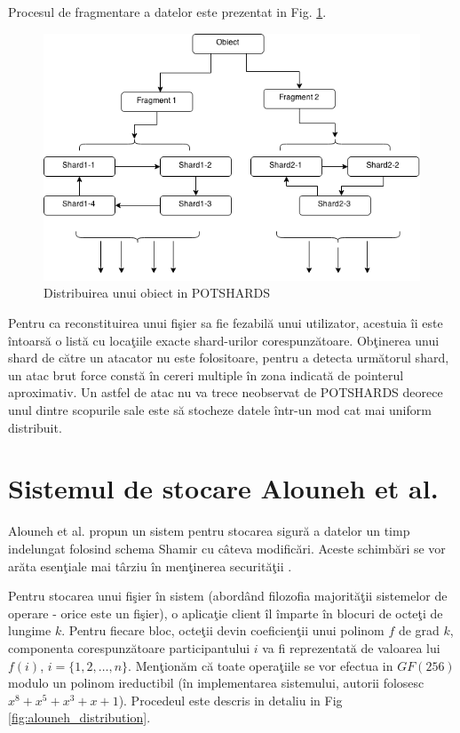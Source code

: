 \documentclass{llncs}
\begin{document}
Procesul de fragmentare a datelor este prezentat in Fig. \ref{fig:potshards-layers}.

\begin{figure}
	\begin{center}
	\includegraphics[width=12cm]{img/POTSHARDS.png}    %
	\caption{Distribuirea unui obiect in POTSHARDS}
	\label{fig:potshards-layers}
	\bigskip
	\end{center}
\end{figure}

Pentru ca reconstituirea unui fi\c{s}ier sa fie fezabil\u{a} unui utilizator, acestuia \^{i}i este \^{i}ntoars\u{a} o list\u{a} cu loca\c{t}iile exacte shard-urilor corespunz\u{a}toare.
Ob\c{t}inerea unui shard de c\u{a}tre un atacator nu este folositoare, pentru a detecta urm\u{a}torul shard, un atac brut force const\u{a} \^{i}n cereri multiple \^{i}n zona indicat\u{a} de pointerul aproximativ. Un astfel de atac nu va trece neobservat de POTSHARDS deorece unul dintre scopurile sale este s\u{a} stocheze datele \^{i}ntr-un mod cat mai uniform distribuit.\cite{SGMV:2009}

\section{Sistemul de stocare Alouneh et al.}
\label{sec:desc_alouneh}

Alouneh et al. propun un sistem pentru stocarea sigur\u{a} a datelor un timp indelungat folosind schema Shamir cu c\^{a}teva modific\u{a}ri. Aceste schimb\u{a}ri se vor ar\u{a}ta esen\c{t}iale mai t\^{a}rziu \^{i}n men\c{t}inerea securit\u{a}\c{t}ii \cite{AAMK:2013}.

Pentru stocarea unui fi\c{s}ier \^{i}n sistem (abord\^{a}nd filozofia majorit\u{a}\c{t}ii sistemelor de operare - orice este un fi\c{s}ier), o aplica\c{t}ie client \^{i}l \^{i}mparte \^{i}n blocuri de octe\c{t}i de lungime $k$. Pentru fiecare bloc, octe\c{t}ii devin coeficien\c{t}ii unui polinom $f$ de grad $k$, componenta corespunz\u{a}toare participantului $i$ va fi reprezentat\u{a} de valoarea lui $f(i)$, $i = \{1,2,\dots, n\}$. 
Men\c{t}ion\u{a}m c\u{a} toate opera\c{t}iile se vor efectua in $GF(256)$ modulo un polinom ireductibil (\^{i}n implementarea sistemului, autorii folosesc $x^8 + x^5 + x^3 + x + 1$). Procedeul este descris in detaliu in Fig \ref{fig:alouneh_distribution}.
\end{document}
